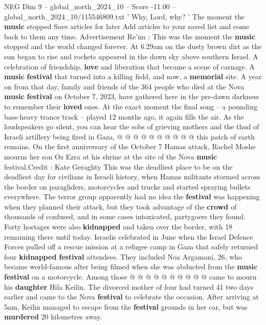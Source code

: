 \begin{textsample}{NEG Dim 9 – global\_north\_2024\_10 – Score -11.00 – global\_north\_2024\_10/115546809.txt}  \label{ex:f9_neg_041}
' Why, Lord, why? ' The moment the \textbf{music} stopped Save articles for later Add articles to your saved list and come back to them any time.
Advertisement Re'im : This was the moment the \textbf{music} stopped and the world changed forever.
At 6.29am on the dusty brown dirt as the sun began to rise and rockets appeared in the dawn sky above southern Israel.
A celebration of friendship, \textbf{love} and liberation that became a scene of carnage.
A \textbf{music} \textbf{festival} that turned into a killing field, and now, a \textbf{memorial} site.
A year on from that day, family and friends of the 364 people who died at the Nova \textbf{music} \textbf{festival} on October 7, 2023, have gathered here in the pre-dawn darkness to remember their \textbf{loved} ones.
At the exact moment the final song -- a pounding bass-heavy trance track -- played 12 months ago, it again fills the air.
As the loudspeakers go silent, you can hear the sobs of grieving mothers and the thud of Israeli artillery being fired in Gaza, @ @ @ @ @ @ @ @ @ @ this patch of earth remains.
On the first anniversary of the October 7 Hamas attack, Rachel Moshe mourns her son Oz Ezra at his shrine at the site of the Nova \textbf{music} festival.Credit : Kate Geraghty This was the deadliest place to be on the deadliest day for civilians in Israeli history, when Hamas militants stormed across the border on paragliders, motorcycles and trucks and started spraying bullets everywhere.
The terror group apparently had no idea the \textbf{festival} was happening when they planned their attack, but they took advantage of the \textbf{crowd} of thousands of confused, and in some cases intoxicated, partygoers they found.
Forty hostages were also \textbf{kidnapped} and taken over the border, with 18 remaining there until today.
Israelis celebrated in June when the Israel Defence Forces pulled off a rescue mission at a refugee camp in Gaza that safely returned four \textbf{kidnapped} \textbf{festival} attendees.
They included Noa Argamani, 26, who became world-famous after being filmed when she was abducted from the \textbf{music} \textbf{festival} on a motorcycle.
Among those @ @ @ @ @ @ @ @ @ @ came to mourn his \textbf{daughter} Hila Keilin.
The divorced mother of four had turned 41 two days earlier and came to the Nova \textbf{festival} to celebrate the occasion.
After arriving at 5am, Keilin managed to escape from the \textbf{festival} grounds in her car, but was \textbf{murdered} 20 kilometres away.

\end{textsample}
